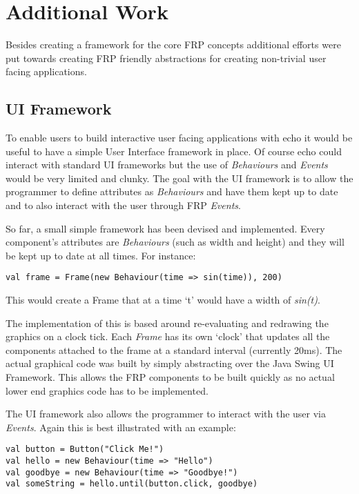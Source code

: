 \documentclass[12pt]{article}
\begin{document}
  \section{Additional Work}
    Besides creating a framework for the core FRP concepts additional efforts
    were put towards creating FRP friendly abstractions for creating non-trivial user facing
    applications.
    
    \subsection{UI Framework}
      To enable users to build interactive user facing applications with echo it would be useful to have a simple User 
      Interface framework in place. Of course echo could interact with standard UI frameworks but the use of \emph{Behaviours} 
      and \emph{Events} would be very limited and clunky. The goal with the UI framework is to allow the programmer to define 
      attributes as \emph{Behaviours} and have them kept up to date and to also interact with the user through FRP 
      \emph{Events}. 

      So far, a small simple framework has been devised and implemented. Every component's attributes are \emph{Behaviours} 
      (such as width and height) and they will be kept up to date at all times. For instance:

\begin{verbatim}
val frame = Frame(new Behaviour(time => sin(time)), 200) 
\end{verbatim}

      This would create a Frame that at a time `t' would have a width of \emph{sin(t)}.

      The implementation of this is based around re-evaluating and redrawing the graphics on a clock tick. Each 
      \emph{Frame} has its own `clock' that updates all the components attached to the frame at a standard interval (currently 
      20ms). The actual graphical code was built by simply abstracting over the Java Swing UI Framework. This allows the FRP 
      components to be built quickly as no actual lower end graphics code has to be implemented.

      The UI framework also allows the programmer to interact with the user via \emph{Events}. Again this is best illustrated 
      with an example:

\begin{verbatim}
val button = Button("Click Me!") 
val hello = new Behaviour(time => "Hello")
val goodbye = new Behaviour(time => "Goodbye!")
val someString = hello.until(button.click, goodbye) 
\end{verbatim}
\end{document}
